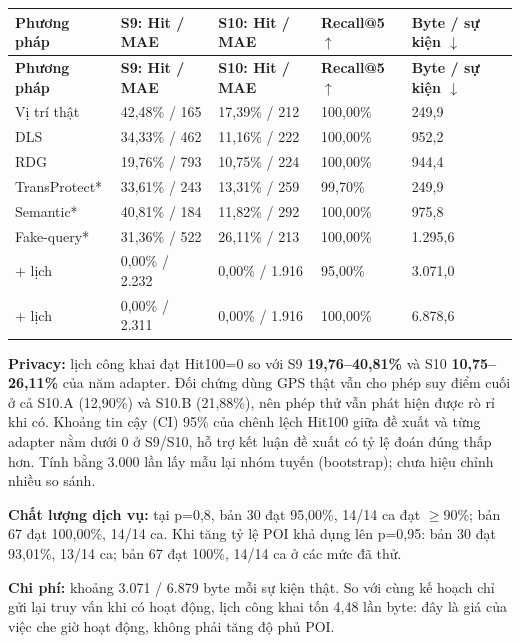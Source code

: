 \documentclass[10pt,a4paper]{article}
\begin{document}
\begingroup\small
\begin{longtable}{@{}P{3.177cm}P{3.658cm}P{3.658cm}P{2.695cm}P{2.888cm}@{}}
\toprule
\textbf{Phương pháp} & \textbf{S9: Hit / MAE} & \textbf{S10: Hit / MAE} & \textbf{Recall@5 $\uparrow$} & \textbf{Byte / sự kiện $\downarrow$}\\\midrule
\endfirsthead
\toprule
\textbf{Phương pháp} & \textbf{S9: Hit / MAE} & \textbf{S10: Hit / MAE} & \textbf{Recall@5 $\uparrow$} & \textbf{Byte / sự kiện $\downarrow$}\\\midrule
\endhead
\bottomrule\endfoot
Vị trí thật & 42,48\% / 165 & 17,39\% / 212 & 100,00\% & 249,9\\
\addlinespace[3pt]
DLS & 34,33\% / 462 & 11,16\% / 222 & 100,00\% & 952,2\\
\addlinespace[3pt]
RDG & 19,76\% / 793 & 10,75\% / 224 & 100,00\% & 944,4\\
\addlinespace[3pt]
TransProtect* & 33,61\% / 243 & 13,31\% / 259 & 99,70\% & 249,9\\
\addlinespace[3pt]
Semantic* & 40,81\% / 184 & 11,82\% / 292 & 100,00\% & 975,8\\
\addlinespace[3pt]
Fake-query* & 31,36\% / 522 & 26,11\% / 213 & 100,00\% & 1.295,6\\
 + lịch & 0,00\% / 2.232 & 0,00\% / 1.916 & 95,00\% & 3.071,0\\
 + lịch & 0,00\% / 2.311 & 0,00\% / 1.916 & 100,00\% & 6.878,6\\
\end{longtable}
\endgroup
\textbf{Privacy:} lịch công khai đạt Hit100=0 so với S9 \textbf{19,76–40,81\%} và S10 \textbf{10,75–26,11\%} của năm adapter. Đối chứng dùng GPS thật vẫn cho phép suy điểm cuối ở cả S10.A (12,90\%) và S10.B (21,88\%), nên phép thử vẫn phát hiện được rò rỉ khi có. Khoảng tin cậy (CI) 95\% của chênh lệch Hit100 giữa đề xuất và từng adapter nằm dưới 0 ở S9/S10, hỗ trợ kết luận đề xuất có tỷ lệ đoán đúng thấp hơn. Tính bằng 3.000 lần lấy mẫu lại nhóm tuyến (bootstrap); chưa hiệu chỉnh nhiều so sánh.

\textbf{Chất lượng dịch vụ:} tại p=0,8, bản 30 đạt 95,00\%, 14/14 ca đạt $\ge$90\%; bản 67 đạt 100,00\%, 14/14 ca. Khi tăng tỷ lệ POI khả dụng lên p=0,95: bản 30 đạt 93,01\%, 13/14 ca; bản 67 đạt 100\%, 14/14 ca ở các mức đã thử.

\textbf{Chi phí:} khoảng 3.071 / 6.879 byte mỗi sự kiện thật. So với cùng kế hoạch chỉ gửi lại truy vấn khi có hoạt động, lịch công khai tốn 4,48 lần byte: đây là giá của việc che giờ hoạt động, không phải tăng độ phủ POI.
\end{document}

